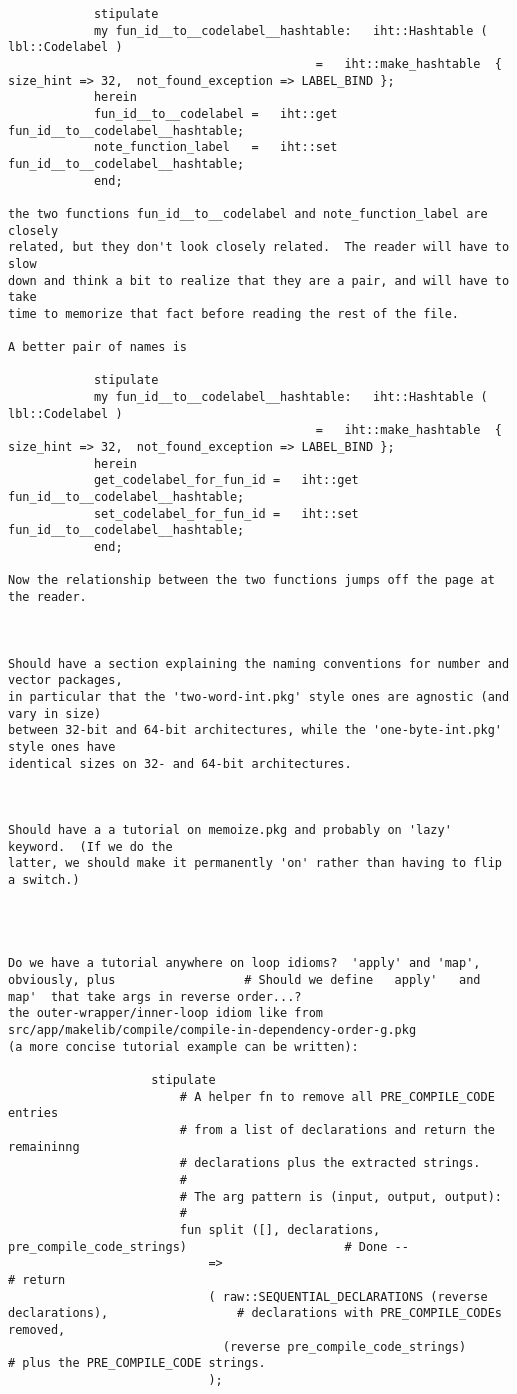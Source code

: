 \begin{verbatim}
		    stipulate
			my fun_id__to__codelabel__hashtable:   iht::Hashtable ( lbl::Codelabel )
				                           =   iht::make_hashtable  { size_hint => 32,  not_found_exception => LABEL_BIND };
		    herein
			fun_id__to__codelabel =   iht::get   fun_id__to__codelabel__hashtable;
			note_function_label   =   iht::set   fun_id__to__codelabel__hashtable;
		    end;

the two functions fun_id__to__codelabel and note_function_label are closely
related, but they don't look closely related.  The reader will have to slow
down and think a bit to realize that they are a pair, and will have to take
time to memorize that fact before reading the rest of the file.

A better pair of names is

		    stipulate
			my fun_id__to__codelabel__hashtable:   iht::Hashtable ( lbl::Codelabel )
				                           =   iht::make_hashtable  { size_hint => 32,  not_found_exception => LABEL_BIND };
		    herein
			get_codelabel_for_fun_id =   iht::get   fun_id__to__codelabel__hashtable;
			set_codelabel_for_fun_id =   iht::set   fun_id__to__codelabel__hashtable;
		    end;

Now the relationship between the two functions jumps off the page at the reader.



Should have a section explaining the naming conventions for number and vector packages,
in particular that the 'two-word-int.pkg' style ones are agnostic (and vary in size)
between 32-bit and 64-bit architectures, while the 'one-byte-int.pkg' style ones have
identical sizes on 32- and 64-bit architectures.



Should have a a tutorial on memoize.pkg and probably on 'lazy' keyword.  (If we do the
latter, we should make it permanently 'on' rather than having to flip a switch.)




Do we have a tutorial anywhere on loop idioms?  'apply' and 'map', obviously, plus					# Should we define   apply'   and   map'  that take args in reverse order...?
the outer-wrapper/inner-loop idiom like from  src/app/makelib/compile/compile-in-dependency-order-g.pkg
(a more concise tutorial example can be written):

					stipulate
					    # A helper fn to remove all PRE_COMPILE_CODE entries
					    # from a list of declarations and return the remaininng
					    # declarations plus the extracted strings.
					    #	
					    # The arg pattern is (input, output, output):
					    #	
					    fun split ([], declarations, pre_compile_code_strings)						# Done --
						    =>												# return 
						    ( raw::SEQUENTIAL_DECLARATIONS (reverse declarations),					# declarations with PRE_COMPILE_CODEs removed,
						      (reverse pre_compile_code_strings)							# plus the PRE_COMPILE_CODE strings.
						    );


\end{verbatim}
